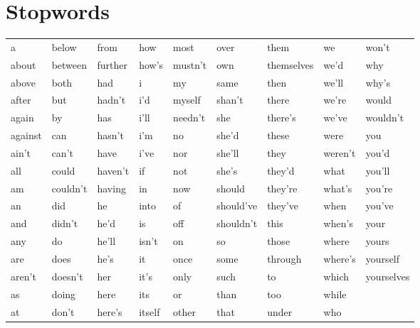 \documentclass[12pt,onecolumn]{IEEEtran}
\begin{document}
	\section{Stopwords}
	\setcounter{figure}{0}  
	\setcounter{equation}{0} 
	\setcounter{table}{0}
	
	\begin{tabular}{|lllllllll|}
		\hline
		a       & below    & from    & how      & most      & over      & them       & we      & won't      \\
		about   & between  & further & how's    & mustn't   & own       & themselves & we'd    & why        \\
		above   & both     & had     & i        & my        & same      & then       & we'll   & why's      \\
		after   & but      & hadn't  & i'd      & myself    & shan't    & there      & we're   & would      \\
		again   & by       & has     & i'll     & needn't   & she       & there's    & we've   & wouldn't   \\
		against & can      & hasn't  & i'm      & no        & she'd     & these      & were    & you        \\
		ain't   & can't    & have    & i've     & nor       & she'll    & they       & weren't & you'd      \\
		all     & could    & haven't & if       & not       & she's     & they'd     & what    & you'll     \\
		am      & couldn't & having  & in       & now       & should    & they're    & what's  & you're     \\
		an      & did      & he      & into     & of        & should've & they've    & when    & you've     \\
		and     & didn't   & he'd    & is       & off       & shouldn't & this       & when's  & your       \\
		any     & do       & he'll   & isn't    & on        & so        & those      & where   & yours      \\
		are     & does     & he's    & it       & once      & some      & through    & where's & yourself   \\
		aren't  & doesn't  & her     & it's     & only      & such      & to         & which   & yourselves \\
		as      & doing    & here    & its      & or        & than      & too        & while   &            \\
		at      & don't    & here's  & itself   & other     & that      & under      & who     &            \\

\end{tabular}
\end{document}
